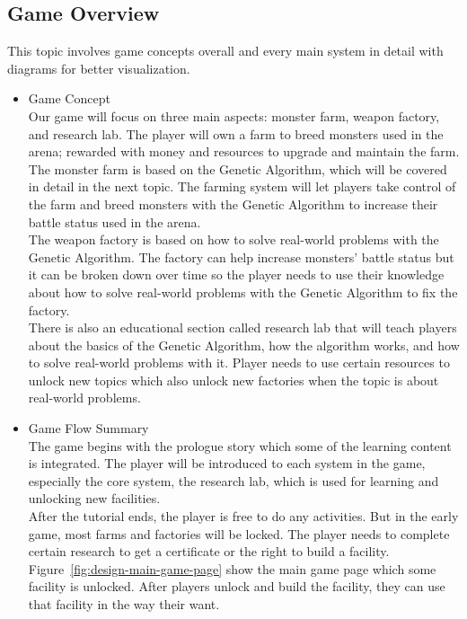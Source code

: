 \documentclass[12pt,oneside,openright,a4paper]{cpe-english-project}
\begin{document}
\subsection{Game Overview}
This topic involves game concepts overall and every main system in detail with diagrams for better visualization.

\begin{itemize}

\item Game Concept \\
	Our game will focus on three main aspects: monster farm, weapon factory, and research lab. The player will own a farm to breed monsters used in the arena; rewarded with money and resources to upgrade and maintain the farm. \\
	The monster farm is based on the Genetic Algorithm, which will be covered in detail in the next topic. The farming system will let players take control of the farm and breed monsters with the Genetic Algorithm to increase their battle status used in the arena. \\
	The weapon factory is based on how to solve real-world problems with the Genetic Algorithm. The factory can help increase monsters’ battle status but it can be broken down over time so the player needs to use their knowledge about how to solve real-world problems with the Genetic Algorithm to fix the factory. \\
 	There is also an educational section called research lab that will teach players about the basics of the Genetic Algorithm, how the algorithm works, and how to solve real-world problems with it. Player needs to use certain resources to unlock new topics which also unlock new factories when the topic is about real-world problems.


\item Game Flow Summary \\
	The game begins with the prologue story which some of the learning content is integrated. The player will be introduced to each system in the game, especially the core system, the research lab, which is used for learning and unlocking new facilities. \\
	After the tutorial ends, the player is free to do any activities. But in the early game, most farms and factories will be locked. The player needs to complete certain research to get a certificate or the right to build a facility. Figure~\ref{fig:design-main-game-page} show the main game page which some facility is unlocked. After players unlock and build the facility, they can use that facility in the way their want.


\end{itemize}
\end{document}
